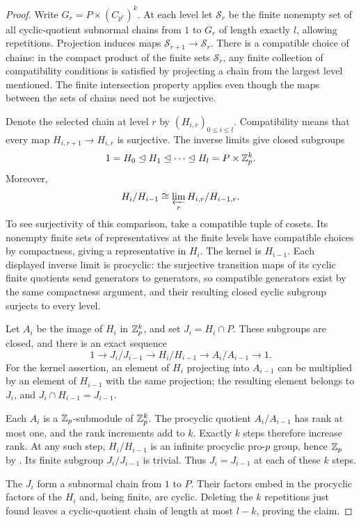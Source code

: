 \begin{proof}
Write $G_r=P\times(C_{p^r})^k$.
At each level let $\mathcal S_r$ be the finite nonempty set of all
cyclic-quotient subnormal chains from $1$ to $G_r$ of length exactly
$l$, allowing repetitions.  Projection induces maps
$\mathcal S_{r+1}\to\mathcal S_r$.
There is a compatible choice of chains: in the compact product of
the finite sets $\mathcal S_r$, any finite collection of compatibility
conditions is satisfied by projecting a chain from the largest level
mentioned.  The finite intersection property applies even though the
maps between the sets of chains need not be surjective.

Denote the selected chain at level $r$ by $(H_{i,r})_{0\leq i\leq l}$.
Compatibility means that every map $H_{i,r+1}\to H_{i,r}$ is
surjective.  The inverse limits give closed subgroups
\[
 1=H_0\trianglelefteq H_1\trianglelefteq\cdots
   \trianglelefteq H_l=P\times\mathbb Z_p^k.
\]
Moreover,
\[
 H_i/H_{i-1}\cong
       \varprojlim_r H_{i,r}/H_{i-1,r}.
\]
To see surjectivity of this comparison, take a compatible tuple of
cosets.  Its nonempty finite sets of representatives at the finite
levels have compatible choices by compactness, giving a representative
in $H_i$.  The kernel is $H_{i-1}$.
Each displayed inverse limit is procyclic: the surjective transition
maps of its cyclic finite quotients send generators to generators,
so compatible generators exist by the same compactness argument,
and their resulting closed cyclic subgroup surjects to every level.

Let $A_i$ be the image of $H_i$ in $\mathbb Z_p^k$, and set
$J_i=H_i\cap P$.  These subgroups are closed, and there is an exact
sequence
\begin{equation}\label{eq:product-series-exact}
 1\longrightarrow J_i/J_{i-1}
  \longrightarrow H_i/H_{i-1}
  \longrightarrow A_i/A_{i-1}\longrightarrow1.
\end{equation}
For the kernel assertion, an element of $H_i$ projecting into
$A_{i-1}$ can be multiplied by an element of $H_{i-1}$ with the same
projection; the resulting element belongs to $J_i$, and
$J_i\cap H_{i-1}=J_{i-1}$.

Each $A_i$ is a $\mathbb Z_p$-submodule of $\mathbb Z_p^k$.
The procyclic quotient $A_i/A_{i-1}$ has rank at most one, and
the rank increments add to $k$.  Exactly $k$ steps therefore increase
rank.  At any such step, $H_i/H_{i-1}$ is an infinite procyclic
pro-$p$ group, hence $\mathbb Z_p$ by .
Its finite subgroup $J_i/J_{i-1}$ is trivial.  Thus
$J_i=J_{i-1}$ at each of these $k$ steps.

The $J_i$ form a subnormal chain from $1$ to $P$.
Their factors embed in the procyclic factors of the $H_i$ and,
being finite, are cyclic.  Deleting the $k$ repetitions just found
leaves a cyclic-quotient chain of length at most $l-k$, proving the
claim.
\end{proof}
